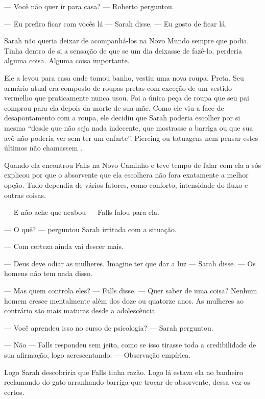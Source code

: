 --- Você não quer ir para casa? --- Roberto perguntou.

--- Eu prefiro ficar com vocês lá --- Sarah disse. --- Eu gosto de ficar lá.

Sarah não queria deixar de acompanhá-los na Novo Mundo sempre que podia. Tinha dentro de si a sensação de que se um dia deixasse de fazê-lo, perderia alguma coisa. Alguma coisa importante.

Ele a levou para casa onde tomou banho, vestiu uma nova roupa. Preta. Seu armário atual era composto de roupas pretas com exceção de um vestido vermelho que praticamente nunca usou. Foi a única peça de roupa que seu pai comprou para ela depois da morte de sua mãe. Como ele viu a face de desapontamento com a roupa, ele decidiu que Sarah poderia escolher por si mesma ``desde que não seja nada indecente, que mostrasse a barriga ou que sua avô não poderia ver sem ter um enfarte''. Piercing ou tatuagens\mudanca{,} nem pensar estes últimos não chamassem .

Quando ela encontrou Falls na Novo Caminho e teve tempo de falar com ela a sós explicou por que o absorvente que ela escolhera não fora exatamente a melhor opção. Tudo dependia de vários fatores, como conforto, intensidade do fluxo e outras coisas.

--- E não ache que acabou --- Falls falou para ela.

--- O quê? --- perguntou Sarah irritada com a situação.

--- Com certeza ainda vai descer mais.

--- Deus deve odiar as mulheres. Imagine ter que dar a luz --- Sarah disse. --- Os homens não tem nada disso.

--- Mas quem controla eles? --- Falls disse. --- Quer saber de uma coisa? Nenhum homem cresce mentalmente além dos doze ou quatorze anos. As mulheres ao contrário são mais maturas desde a adolescência.

--- Você aprendeu isso no curso de psicologia? --- Sarah perguntou.

--- Não --- Falls respondeu\mudanca{,} sem jeito, como se isso tirasse toda a credibilidade de sua afirmação, logo acrescentando: --- Observação empírica.

Logo Sarah descobriria que Falls tinha razão. Logo lá estava ela no banheiro reclamando do gato arranhando  barriga que trocar de absorvente, dessa vez  os certos.

